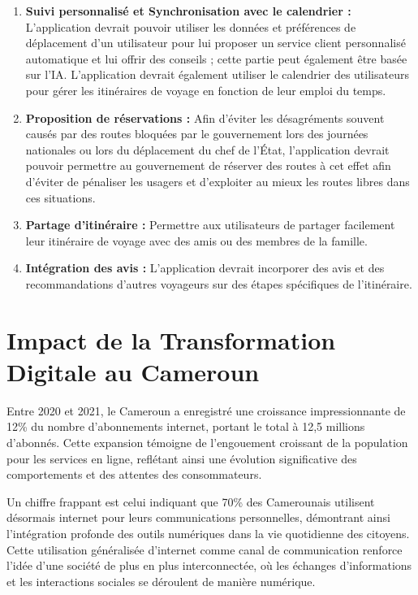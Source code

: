 \documentclass{article}
\begin{document}
\begin{enumerate}
\item \textbf{Suivi personnalisé et Synchronisation avec le calendrier :}
L'application devrait pouvoir utiliser les données et préférences de déplacement d'un utilisateur pour lui proposer un service client personnalisé automatique et lui offrir des conseils ; cette partie peut également être basée sur l'IA. L’application devrait également utiliser le calendrier des utilisateurs pour gérer les itinéraires de voyage en fonction de leur emploi du temps.

\item \textbf{Proposition de réservations :}
Afin d'éviter les désagréments souvent causés par des routes bloquées par le gouvernement lors des journées nationales ou lors du déplacement du chef de l'État, l'application devrait pouvoir permettre au gouvernement de réserver des routes à cet effet afin d'éviter de pénaliser les usagers et d'exploiter au mieux les routes libres dans ces situations.

\item \textbf{Partage d’itinéraire :}
Permettre aux utilisateurs de partager facilement leur itinéraire de voyage avec des amis ou des membres de la famille.

\item \textbf{Intégration des avis :}
L'application devrait incorporer des avis et des recommandations d'autres voyageurs sur des étapes spécifiques de l'itinéraire.
\end{enumerate}

\section{Impact de la Transformation Digitale au Cameroun}

Entre 2020 et 2021, le Cameroun a enregistré une croissance impressionnante de 12\% du nombre d'abonnements internet, portant le total à 12,5 millions d'abonnés. Cette expansion témoigne de l'engouement croissant de la population pour les services en ligne, reflétant ainsi une évolution significative des comportements et des attentes des consommateurs.

Un chiffre frappant est celui indiquant que 70\% des Camerounais utilisent désormais internet pour leurs communications personnelles, démontrant ainsi l'intégration profonde des outils numériques dans la vie quotidienne des citoyens. Cette utilisation généralisée d'internet comme canal de communication renforce l'idée d'une société de plus en plus interconnectée, où les échanges d'informations et les interactions sociales se déroulent de manière numérique.
\end{document}
